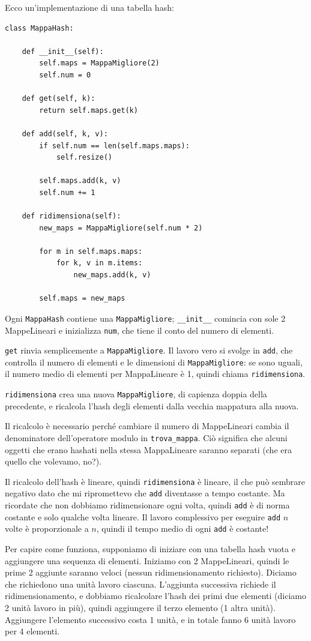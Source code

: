 \documentclass[10pt]{book}
\begin{document}
Ecco un'implementazione di una tabella hash:

\begin{verbatim}
class MappaHash:

    def __init__(self):
        self.maps = MappaMigliore(2)
        self.num = 0

    def get(self, k):
        return self.maps.get(k)

    def add(self, k, v):
        if self.num == len(self.maps.maps):
            self.resize()

        self.maps.add(k, v)
        self.num += 1

    def ridimensiona(self):
        new_maps = MappaMigliore(self.num * 2)

        for m in self.maps.maps:
            for k, v in m.items:
                new_maps.add(k, v)

        self.maps = new_maps
\end{verbatim}

Ogni {\tt MappaHash} contiene una {\tt MappaMigliore}; \verb"__init__" comincia con sole 2 MappeLineari e inizializza {\tt num}, che tiene il conto del numero di elementi.

{\tt get} rinvia semplicemente a {\tt MappaMigliore}.  Il lavoro vero si svolge in {\tt add}, che controlla il numero di elementi e le dimensioni di
{\tt MappaMigliore}: se sono uguali, il numero medio di elementi per MappaLineare è 1, quindi chiama {\tt ridimensiona}.

{\tt ridimensiona} crea una nuova {\tt MappaMigliore}, di capienza doppia della precedente, e ricalcola l'hash degli elementi dalla vecchia mappatura alla nuova.

Il ricalcolo è necessario perché cambiare il numero di MappeLineari cambia il denominatore dell'operatore modulo in \verb"trova_mappa".  Ciò significa che alcuni oggetti che erano hashati nella stessa MappaLineare saranno separati (che era quello che volevamo, no?).

Il ricalcolo dell'hash è lineare, quindi {\tt ridimensiona} è lineare, il che può sembrare negativo dato che mi ripromettevo che {\tt add} diventasse a tempo costante.  Ma ricordate che non dobbiamo ridimensionare ogni volta, quindi {\tt add} è di norma costante e solo qualche volta lineare. Il lavoro complessivo per eseguire {\tt add} $n$ volte è proporzionale a $n$, quindi il tempo medio di ogni {\tt add} è costante!

Per capire come funziona, supponiamo di iniziare con una tabella hash vuota e aggiungere una sequenza di elementi. Iniziamo con 2 MappeLineari, quindi le prime 2 aggiunte saranno veloci (nessun ridimensionamento richiesto). Diciamo che richiedono una unità lavoro ciascuna. L'aggiunta successiva richiede il ridimensionamento, e dobbiamo ricalcolare l'hash dei primi due elementi (diciamo 2 unità lavoro in più), quindi aggiungere il terzo elemento (1 altra unità). Aggiungere l'elemento successivo costa 1 unità, e in totale fanno 6 unità lavoro per 4 elementi.
\end{document}
